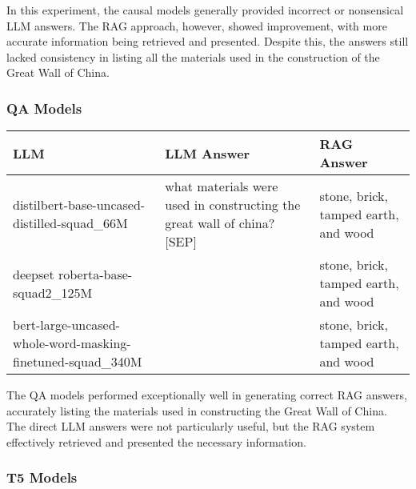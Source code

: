 \documentclass[11pt]{wseas}
\begin{document}
In this experiment, the causal models generally provided incorrect or
nonsensical LLM answers. The RAG approach, however, showed improvement,
with more accurate information being retrieved and presented. Despite
this, the answers still lacked consistency in listing all the materials
used in the construction of the Great Wall of China.

\subsubsection{QA Models}\label{qa-models}

\begin{longtable}[]{@{}
  >{\raggedright\arraybackslash}p{}
  >{\raggedright\arraybackslash}p{}
  >{\raggedright\arraybackslash}p{}@{}}
\toprule\noalign{}
\begin{minipage}[b]{\linewidth}\raggedright
LLM
\end{minipage} & \begin{minipage}[b]{\linewidth}\raggedright
LLM Answer
\end{minipage} & \begin{minipage}[b]{\linewidth}\raggedright
RAG Answer
\end{minipage} \\
\midrule\noalign{}
\endhead
\bottomrule\noalign{}
\endlastfoot
distilbert-base-uncased-distilled-squad\_66M & what materials were used
in constructing the great wall of china? {[}SEP{]} & stone, brick,
tamped earth, and wood \\
deepset roberta-base-squad2\_125M & & stone, brick, tamped earth, and
wood \\
bert-large-uncased-whole-word-masking-finetuned-squad\_340M & & stone,
brick, tamped earth, and wood \\
\end{longtable}

The QA models performed exceptionally well in generating correct RAG
answers, accurately listing the materials used in constructing the Great
Wall of China. The direct LLM answers were not particularly useful, but
the RAG system effectively retrieved and presented the necessary
information.

\subsubsection{T5 Models}\label{t5-models}
\end{document}
